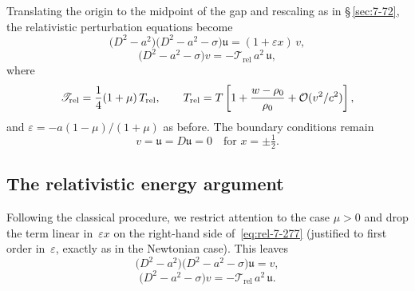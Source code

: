 Translating the origin to the midpoint of the gap and rescaling as in
\S\,\ref{sec:7-72}, the relativistic perturbation equations become
\begin{equation}
\label{eq:rel-7-277}
\bigl(D^{2}-a^{2}\bigr)
\bigl(D^{2}-a^{2}-\sigma\bigr)\mathfrak{u}
= (1+\varepsilon x)\,v,
\end{equation}
\begin{equation}
\label{eq:rel-7-278}
\bigl(D^{2}-a^{2}-\sigma\bigr)v
= -\mathscr{T}_{\mathrm{rel}}\,a^{2}\,\mathfrak{u},
\end{equation}
where
\begin{equation}
\label{eq:rel-7-279}
\mathscr{T}_{\mathrm{rel}}
= \frac{1}{4}(1+\mu)\,T_{\mathrm{rel}},
\qquad
T_{\mathrm{rel}}
= T\left[1 + \frac{w - \rho_0}{\rho_0}
         + \mathcal{O}(v^{2}/c^{2})\right],
\end{equation}
and $\varepsilon=-a(1-\mu)/(1+\mu)$ as before.  The boundary conditions
remain
\begin{equation}
\label{eq:rel-7-280}
v = \mathfrak{u} = D\mathfrak{u} = 0
\quad\text{for } x = \pm\tfrac{1}{2}.
\end{equation}

\subsection{The relativistic energy argument}
\label{sec:rel-7-72b}

Following the classical procedure, we restrict attention to the case
$\mu > 0$ and drop the term linear in~$\varepsilon x$ on the right-hand
side of~\eqref{eq:rel-7-277} (justified to first order
in~$\varepsilon$, exactly as in the Newtonian case).  This leaves
\begin{equation}
\label{eq:rel-7-281}
\bigl(D^{2}-a^{2}\bigr)
\bigl(D^{2}-a^{2}-\sigma\bigr)\mathfrak{u} = v,
\end{equation}
\begin{equation}
\label{eq:rel-7-282}
\bigl(D^{2}-a^{2}-\sigma\bigr)v
= -\mathscr{T}_{\mathrm{rel}}\,a^{2}\,\mathfrak{u}.
\end{equation}

